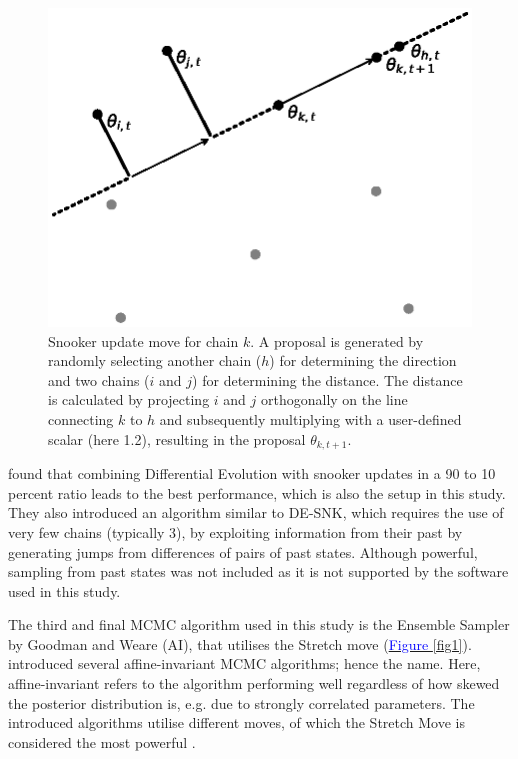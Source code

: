 \begin{figure}[ht]
\centering
\includegraphics[width=1.0\linewidth]{Figures/snooker_move_2025.eps}
\caption{Snooker update move for chain $k$. A proposal is generated by randomly selecting another chain ($h$) for determining the direction and two chains ($i$ and $j$) for determining the distance. The distance is calculated by projecting $i$ and $j$ orthogonally on the line connecting $k$ to $h$ and subsequently multiplying with a user-defined scalar (here 1.2), resulting in the proposal $\theta_{k,t+1}$.}\label{fig2b}
\end{figure}
\noindent \cite{terbraak2008differential} found that combining Differential Evolution with snooker updates in a 90 to 10 percent ratio leads to the best performance, which is also the setup in this study. They also introduced an algorithm similar to DE-SNK, which requires the use of very few chains (typically 3), by exploiting information from their past by
generating jumps from differences of pairs of past states. Although powerful, sampling from past states was not included as it is not supported by the software used in this study. 

The third and final MCMC algorithm used in this study is the Ensemble Sampler by Goodman and Weare (AI), that utilises the Stretch move (\hyperref[fig1]{\textcolor{blue}{Figure }\ref{fig1}}). \cite{goodman2010ensemble} introduced several affine-invariant MCMC algorithms; hence the name. Here, affine-invariant refers to the algorithm performing well regardless of how skewed the posterior distribution is, e.g. due to strongly correlated parameters. The introduced algorithms utilise different moves, of which the Stretch Move is considered the most powerful \citep{goodman2010ensemble}.

